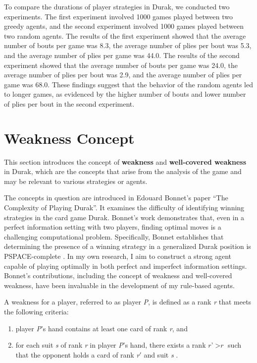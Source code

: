 To compare the durations of player strategies in Durak, we conducted two experiments. The first experiment involved 1000 games played between two greedy agents, and the second experiment involved 1000 games played between two random agents. The results of the first experiment showed that the average number of bouts per game was 8.3, the average number of plies per bout was 5.3, and the average number of plies per game was 44.0. The results of the second experiment showed that the average number of bouts per game was 24.0, the average number of plies per bout was 2.9, and the average number of plies per game was 68.0. These findings suggest that the behavior of the random agents led to longer games, as evidenced by the higher number of bouts and lower number of plies per bout in the second experiment.

\section{Weakness Concept}
\label{weaknessConcept}
This section introduces the concept of \textbf{weakness} and \textbf{well-covered weakness} in Durak, which are the concepts that arise from the analysis of the game and may be relevant to various strategies or agents.

The concepts in question are introduced in Edouard Bonnet's paper ``The Complexity of Playing Durak''. It examines the difficulty of identifying winning strategies in the card game Durak. Bonnet's work demonstrates that, even in a perfect information setting with two players, finding optimal moves is a challenging computational problem. Specifically, Bonnet establishes that determining the presence of a winning strategy in a generalized Durak position is PSPACE-complete \citep{Bonnet2016TheCO}. In my own research, I aim to construct a strong agent capable of playing optimally in both perfect and imperfect information settings. Bonnet's contributions, including the concept of weakness and well-covered weakness, have been invaluable in the development of my rule-based agents.

A weakness for a player, referred to as player \textit{P}, is defined as a rank \textit{r} that meets the following criteria: 
\begin{enumerate}
	\item player \textit{P}'s hand contains at least one card of rank \textit{r}, and
	\item for each suit \textit{s} of rank \textit{r} in player \textit{P}'s hand, there exists a rank $\textit{r}$'$ > \textit{r}$ such that the opponent holds a card of rank \textit{r}$'$ and suit \textit{s} \citep{Bonnet2016TheCO}.
\end{enumerate}

